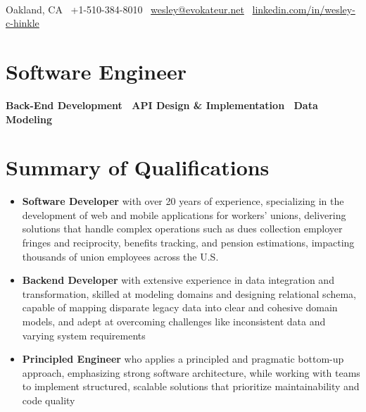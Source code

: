 \documentclass[a4paper,10pt]{article}
\begin{document}
\begin{center}
     \\
    Oakland, CA \textbar\ +1-510-384-8010 \textbar\ \href{mailto:wesley@evokateur.net}{wesley@evokateur.net} \textbar\ \href{https://linkedin.com/in/wesley-c-hinkle}{linkedin.com/in/wesley-c-hinkle
}
\end{center}

\section*{Software Engineer}
\begin{center}
\textbf{Back-End Development \textbar\ API Design \& Implementation \textbar\ Data Modeling}
\end{center}

\section*{Summary of Qualifications}
\begin{itemize}[itemsep=0em]

    \item \textbf{Software Developer} with over 20 years of experience, specializing in the development of web and mobile applications for workers' unions, delivering solutions that handle complex operations such as dues collection employer fringes and reciprocity, benefits tracking, and pension estimations, impacting thousands of union employees across the U.S.

    \item \textbf{Backend Developer} with extensive experience in data integration and transformation, skilled at modeling domains and designing relational schema, capable of mapping disparate legacy data into clear and cohesive domain models, and adept at overcoming challenges like inconsistent data and varying system requirements

    \item \textbf{Principled Engineer} who applies a principled and pragmatic bottom-up approach, emphasizing strong software architecture, while working with teams to implement structured, scalable solutions that prioritize maintainability and code quality

\end{itemize}
\end{document}
